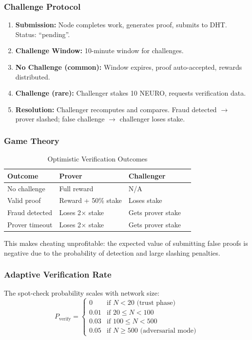 \documentclass[11pt,a4paper]{article}
\begin{document}
\subsubsection{Challenge Protocol}
\begin{enumerate}
    \item \textbf{Submission:} Node completes work, generates proof, submits to DHT. Status: ``pending''.
    \item \textbf{Challenge Window:} 10-minute window for challenges.
    \item \textbf{No Challenge (common):} Window expires, proof auto-accepted, rewards distributed.
    \item \textbf{Challenge (rare):} Challenger stakes 10 NEURO, requests verification data.
    \item \textbf{Resolution:} Challenger recomputes and compares. Fraud detected $\rightarrow$ prover slashed; false challenge $\rightarrow$ challenger loses stake.
\end{enumerate}

\subsubsection{Game Theory}
\begin{table}[H]
\centering
\caption{Optimistic Verification Outcomes}
\begin{tabular}{@{}llll@{}}
\toprule
\textbf{Outcome} & \textbf{Prover} & \textbf{Challenger} \\
\midrule
No challenge & Full reward & N/A \\
Valid proof & Reward + 50\% stake & Loses stake \\
Fraud detected & Loses 2$\times$ stake & Gets prover stake \\
Prover timeout & Loses 2$\times$ stake & Gets prover stake \\
\bottomrule
\end{tabular}
\end{table}

This makes cheating unprofitable: the expected value of submitting false proofs is negative due to the probability of detection and large slashing penalties.

\subsubsection{Adaptive Verification Rate}
The spot-check probability scales with network size:
\begin{equation}
P_{\text{verify}} = \begin{cases}
0 & \text{if } N < 20 \text{ (trust phase)} \\
0.01 & \text{if } 20 \leq N < 100 \\
0.03 & \text{if } 100 \leq N < 500 \\
0.05 & \text{if } N \geq 500 \text{ (adversarial mode)}
\end{cases}
\end{equation}
\end{document}

